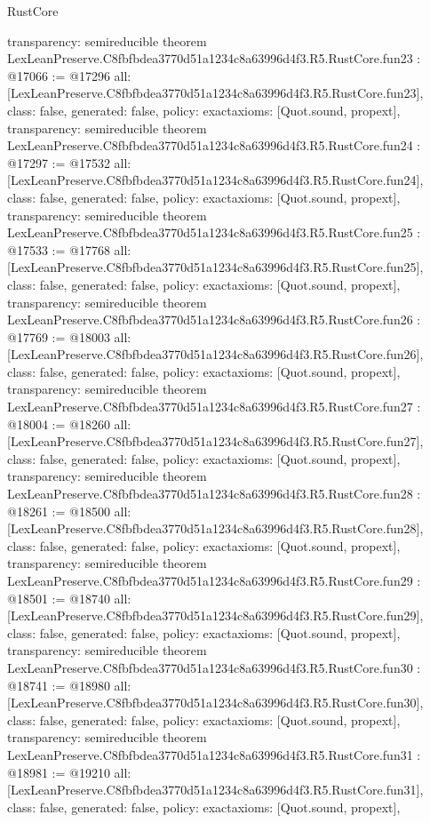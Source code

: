 \begin{lexlean}{RustCore}
\begin{coremodule}
{  transparency: semireducible
}
theorem LexLeanPreserve.C8fbfbdea3770d51a1234c8a63996d4f3.R5.RustCore.fun23 : @17066 := @17296 {
  all: [LexLeanPreserve.C8fbfbdea3770d51a1234c8a63996d4f3.R5.RustCore.fun23],
  class: false,
  generated: false,
  policy: exact{axioms: [Quot.sound, propext]},
  transparency: semireducible
}
theorem LexLeanPreserve.C8fbfbdea3770d51a1234c8a63996d4f3.R5.RustCore.fun24 : @17297 := @17532 {
  all: [LexLeanPreserve.C8fbfbdea3770d51a1234c8a63996d4f3.R5.RustCore.fun24],
  class: false,
  generated: false,
  policy: exact{axioms: [Quot.sound, propext]},
  transparency: semireducible
}
theorem LexLeanPreserve.C8fbfbdea3770d51a1234c8a63996d4f3.R5.RustCore.fun25 : @17533 := @17768 {
  all: [LexLeanPreserve.C8fbfbdea3770d51a1234c8a63996d4f3.R5.RustCore.fun25],
  class: false,
  generated: false,
  policy: exact{axioms: [Quot.sound, propext]},
  transparency: semireducible
}
theorem LexLeanPreserve.C8fbfbdea3770d51a1234c8a63996d4f3.R5.RustCore.fun26 : @17769 := @18003 {
  all: [LexLeanPreserve.C8fbfbdea3770d51a1234c8a63996d4f3.R5.RustCore.fun26],
  class: false,
  generated: false,
  policy: exact{axioms: [Quot.sound, propext]},
  transparency: semireducible
}
theorem LexLeanPreserve.C8fbfbdea3770d51a1234c8a63996d4f3.R5.RustCore.fun27 : @18004 := @18260 {
  all: [LexLeanPreserve.C8fbfbdea3770d51a1234c8a63996d4f3.R5.RustCore.fun27],
  class: false,
  generated: false,
  policy: exact{axioms: [Quot.sound, propext]},
  transparency: semireducible
}
theorem LexLeanPreserve.C8fbfbdea3770d51a1234c8a63996d4f3.R5.RustCore.fun28 : @18261 := @18500 {
  all: [LexLeanPreserve.C8fbfbdea3770d51a1234c8a63996d4f3.R5.RustCore.fun28],
  class: false,
  generated: false,
  policy: exact{axioms: [Quot.sound, propext]},
  transparency: semireducible
}
theorem LexLeanPreserve.C8fbfbdea3770d51a1234c8a63996d4f3.R5.RustCore.fun29 : @18501 := @18740 {
  all: [LexLeanPreserve.C8fbfbdea3770d51a1234c8a63996d4f3.R5.RustCore.fun29],
  class: false,
  generated: false,
  policy: exact{axioms: [Quot.sound, propext]},
  transparency: semireducible
}
theorem LexLeanPreserve.C8fbfbdea3770d51a1234c8a63996d4f3.R5.RustCore.fun30 : @18741 := @18980 {
  all: [LexLeanPreserve.C8fbfbdea3770d51a1234c8a63996d4f3.R5.RustCore.fun30],
  class: false,
  generated: false,
  policy: exact{axioms: [Quot.sound, propext]},
  transparency: semireducible
}
theorem LexLeanPreserve.C8fbfbdea3770d51a1234c8a63996d4f3.R5.RustCore.fun31 : @18981 := @19210 {
  all: [LexLeanPreserve.C8fbfbdea3770d51a1234c8a63996d4f3.R5.RustCore.fun31],
  class: false,
  generated: false,
  policy: exact{axioms: [Quot.sound, propext]},
}
\end{coremodule}
\end{lexlean}
